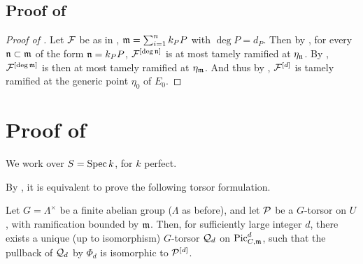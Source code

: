 \subsection{\texorpdfstring{Proof of }{Proof of the tameness theorem}}\label{subsection:proof_of_tameness_theorem}
\begin{proof}[Proof of ]
     Let $\cF$ be as in , $\mdls = \sum_{i=1}^n k_P P$ with $\deg P = d_P$.
     Then by , for every $\ndls \subset \mdls$ of the form $\ndls = k_P P$, $\cF^{[\deg \ndls]}$ is at most tamely ramified at $\eta_\ndls$.
     By , $\cF^{[\deg \mdls]}$ is then at most tamely ramified at $\eta_\mdls$. And thus by ,
     $\cF^{[d]}$ is tamely ramified at the generic point $\eta_0$  of $E_0$.
\end{proof}


\section{\texorpdfstring{Proof of }{Proof of the main theorem}}\label{section:proof_of_GCFT_reduced}

We work over $S=\Spec k$, for $k$ perfect.

By , it is equivalent to prove the
following torsor formulation.
\begin{theorem} \label{thm:GCFT_torsors}
    Let $G=\Lambda^\times$ be a finite abelian group ($\Lambda$ as before), and let $\cP$ be a $G$-torsor on $U$, with ramification bounded by $\mdls$.
    Then, for sufficiently large integer $d$, there exists a unique (up to isomorphism) $G$-torsor $\cQ_d$ on $\PicCm[d]$, such that the pullback of $\cQ_d$ by $\Phi_d$ is isomorphic to $\cP^{[d]}$.
\end{theorem}

